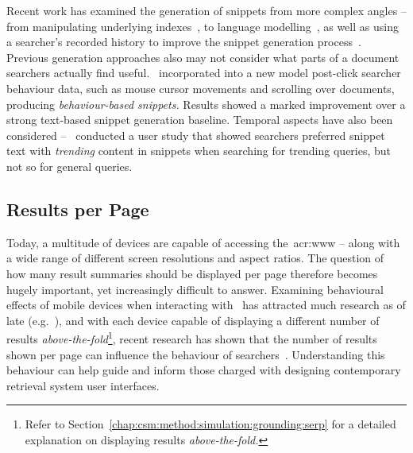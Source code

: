 Recent work has examined the generation of snippets from more complex angles -- from manipulating underlying indexes~\citep{turpin2007fast_snippets, bast2014snippet_generation}, to language modelling~\citep{li2010snippet_extraction, he2012bridging}, as well as using a searcher's recorded history to improve the snippet generation process~\citep{ageev2013summaries, savenkov2011search}. Previous generation approaches also may not consider what parts of a document searchers actually find useful.~\cite{ageev2013summaries} incorporated into a new model post-click searcher behaviour data, such as mouse cursor movements and scrolling over documents, producing \emph{behaviour-based snippets.} Results showed a marked improvement over a strong text-based snippet generation baseline. Temporal aspects have also been considered --~\cite{svore2012temporal_snippets} conducted a user study that showed searchers preferred snippet text with \emph{trending} content in snippets when searching for trending queries, but not so for general queries.

\subsection{Results per Page}
Today, a multitude of devices are capable of accessing the~\gls{acr:www} -- along with a wide range of different screen resolutions and aspect ratios. The question of how many result summaries should be displayed per page therefore becomes hugely important, yet increasingly difficult to answer. Examining behavioural effects of mobile devices when interacting with~ has attracted much research as of late (e.g.~\cite{kim2012small_vs_large, kim2014eye_tracking, kim2016pagination_versus_scrolling}), and with each device capable of displaying a different number of results \emph{above-the-fold}\footnote{Refer to Section~\ref{chap:csm:method:simulation:grounding:serp} for a detailed explanation on displaying results \emph{above-the-fold.}}, recent research has shown that the number of results shown per page can influence the behaviour of searchers~\citep{joachims2005click_model, kim2014eye_tracking}. Understanding this behaviour can help guide and inform those charged with designing contemporary retrieval system user interfaces.

